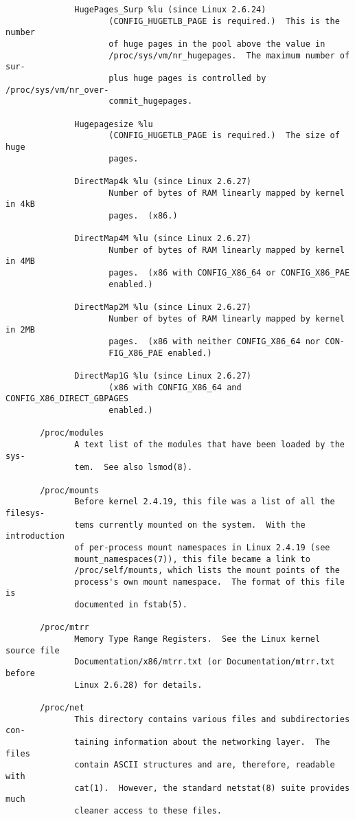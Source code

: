 \documentclass[]{article}
\begin{document}
\begin{verbatim}
              HugePages_Surp %lu (since Linux 2.6.24)
                     (CONFIG_HUGETLB_PAGE is required.)  This is the number
                     of huge pages in the pool above the value in
                     /proc/sys/vm/nr_hugepages.  The maximum number of sur‐
                     plus huge pages is controlled by /proc/sys/vm/nr_over‐
                     commit_hugepages.

              Hugepagesize %lu
                     (CONFIG_HUGETLB_PAGE is required.)  The size of huge
                     pages.

              DirectMap4k %lu (since Linux 2.6.27)
                     Number of bytes of RAM linearly mapped by kernel in 4kB
                     pages.  (x86.)

              DirectMap4M %lu (since Linux 2.6.27)
                     Number of bytes of RAM linearly mapped by kernel in 4MB
                     pages.  (x86 with CONFIG_X86_64 or CONFIG_X86_PAE
                     enabled.)

              DirectMap2M %lu (since Linux 2.6.27)
                     Number of bytes of RAM linearly mapped by kernel in 2MB
                     pages.  (x86 with neither CONFIG_X86_64 nor CON‐
                     FIG_X86_PAE enabled.)

              DirectMap1G %lu (since Linux 2.6.27)
                     (x86 with CONFIG_X86_64 and CONFIG_X86_DIRECT_GBPAGES
                     enabled.)

       /proc/modules
              A text list of the modules that have been loaded by the sys‐
              tem.  See also lsmod(8).

       /proc/mounts
              Before kernel 2.4.19, this file was a list of all the filesys‐
              tems currently mounted on the system.  With the introduction
              of per-process mount namespaces in Linux 2.4.19 (see
              mount_namespaces(7)), this file became a link to
              /proc/self/mounts, which lists the mount points of the
              process's own mount namespace.  The format of this file is
              documented in fstab(5).

       /proc/mtrr
              Memory Type Range Registers.  See the Linux kernel source file
              Documentation/x86/mtrr.txt (or Documentation/mtrr.txt before
              Linux 2.6.28) for details.

       /proc/net
              This directory contains various files and subdirectories con‐
              taining information about the networking layer.  The files
              contain ASCII structures and are, therefore, readable with
              cat(1).  However, the standard netstat(8) suite provides much
              cleaner access to these files.


\end{verbatim}
\end{document}
